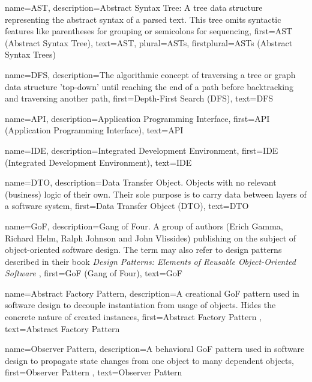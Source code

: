 {
    name=AST,
    description={Abstract Syntax Tree: A tree data structure representing the abstract syntax of a parsed text. This tree omits syntactic features like parentheses for grouping or semicolons for sequencing},
    first={AST (Abstract Syntax Tree)},
    text={AST},
    plural={ASTs},
    firstplural={ASTs (Abstract Syntax Trees)}
}

{
    name=DFS,
    description={The algorithmic concept of traversing a tree or graph data structure 'top-down' until reaching the end of a path before backtracking and traversing another path},
    first={Depth-First Search (DFS)},
    text={DFS}
}

{
    name=API,
    description={Application Programming Interface},
    first={API (Application Programming Interface)},
    text={API}
}

{
    name=IDE,
    description={Integrated Development Environment},
    first={IDE (Integrated Development Environment)},
    text={IDE}
}

{
    name=DTO,
    description={Data Transfer Object. Objects with no relevant (business) logic of their own. Their sole purpose is to carry data between layers of a software system},
    first={Data Transfer Object (DTO)},
    text={DTO}
}

{
    name=GoF,
    description={Gang of Four. A group of authors (Erich Gamma, Richard Helm, Ralph Johnson and John Vlissides) publishing on the subject of object-oriented software design. The term may also refer to design patterns described in their book \textit{Design Patterns: Elements of Reusable Object-Oriented Software} \cite{Gamma:1995:DPE:186897}},
    first={GoF (Gang of Four)},
    text={GoF}
}

{
    name={Abstract Factory Pattern},
    description={A creational \gls{GoF} pattern used in software design to decouple instantiation from usage of objects. Hides the concrete nature of created instances},
    first={Abstract Factory Pattern \cite{Gamma:1995:DPE:186897}},
    text={Abstract Factory Pattern}
}

{
    name={Observer Pattern},
    description={A behavioral \gls{GoF} pattern used in software design to propagate state changes from one object to many dependent objects},
    first={Observer Pattern \cite{Gamma:1995:DPE:186897}},
    text={Observer Pattern}
}

